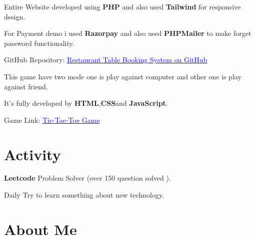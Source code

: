 \documentclass{deedy-resume-openfont}
\begin{document}
\begin{minipage}[t]{0.66\textwidth}
\begin{tightemize}
\item Entire Website developed using  \textbf{PHP} and also used \textbf{Tailwind} for responsive design.
\item  For Payment demo i used \textbf{Razorpay} and also used \textbf{PHPMailer} to make forget password functionality.
\item GitHub Repository: \href{https://github.com/RudraSarkar5/Restaurant_Booking_System_In_Php}{\textcolor{blue}{Restaurant Table Booking System on GitHub}}

\end{tightemize}
\sectionsep



\begin{tightemize}
\item This game have two mode one is play against computer and other one is play against friend.
\item It's fully developed by \textbf{HTML},\textbf{CSS}and \textbf{JavaScript}.

\item Game Link:
\href{https://rudrasarkar5.github.io/tic-tac-toe/}{\textcolor{blue}{Tic-Tac-Toe Game}}

\end{tightemize}
\sectionsep




\section{Activity}
\vspace{\topsep} %
\begin{tightemize}

\item \textbf{Leetcode} Problem Solver (over 150 question solved ).
\item Daily Try to learn something about new technology.


\end{tightemize}
\sectionsep

\section{About Me} 
\vspace{\topsep} %
\begin{tightemize}


\end{tightemize}
\end{minipage}
\end{document}
